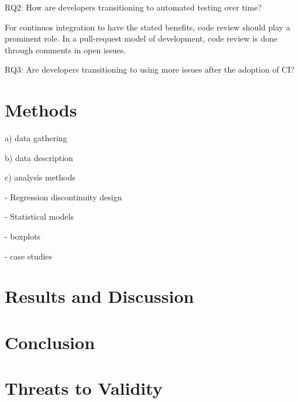 \documentclass[conference]{IEEEtran}
\begin{document}
RQ2: How are developers transitioning to automated testing over time?

For continuos integration to have the stated benefits, code review should play a prominent role. In a pull-request model of development, code review is done through comments in open issues.

RQ3: Are developers transitioning to using more issues after the adoption of CI?



\section{Methods}

a) data gathering

b) data description

c) analysis methods

- Regression discontinuity design




- Statistical models

- boxplots

- case studies



\section{Results and Discussion}





\section{Conclusion}

\section{Threats to Validity}



\end{document}
